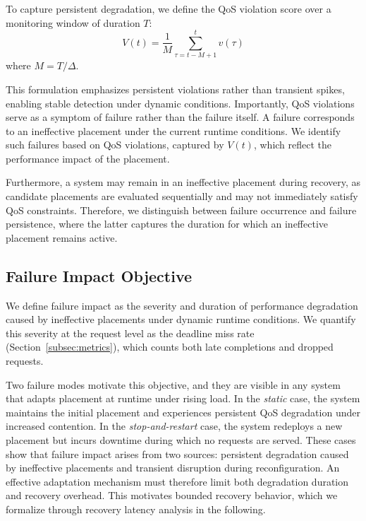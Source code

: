 \documentclass[conference]{IEEEtran}
\begin{document}
To capture persistent degradation, we define the QoS violation score over a monitoring window of duration $T$:
\begin{equation}
V(t) = \frac{1}{M} \sum_{\tau=t-M+1}^{t} v(\tau)
\end{equation}
where $M = T/\Delta$.

This formulation emphasizes persistent violations rather than transient spikes, enabling stable detection under dynamic conditions. 
Importantly, QoS violations serve as a symptom of failure rather than the failure itself. 
A failure corresponds to an ineffective placement under the current runtime conditions.
We identify such failures based on QoS violations, captured by $V(t)$, which reflect the performance impact of the placement.

Furthermore, a system may remain in an ineffective placement during recovery, as candidate placements are evaluated sequentially and may not immediately satisfy QoS constraints. 
Therefore, we distinguish between failure occurrence and failure persistence, where the latter captures the duration for which an ineffective placement remains active.


\subsection{Failure Impact Objective}

We define failure impact as the severity and duration of performance degradation caused by ineffective placements under dynamic runtime conditions. \textcolor{navyblue}{We quantify this severity at the request level as the deadline miss rate (Section~\ref{subsec:metrics}), which counts both late completions and dropped requests.}

\textcolor{navyblue}{Two failure modes motivate this objective, and they are visible in any system that adapts placement at runtime under rising load.}
In the \emph{static} case, the system maintains the initial placement and experiences persistent QoS degradation under increased contention. 
In the \emph{stop-and-restart} case, the system redeploys a new placement but incurs downtime during which no requests are served.
%
These cases show that failure impact arises from two sources: persistent degradation caused by ineffective placements and transient disruption during reconfiguration. 
An effective adaptation mechanism must therefore limit both degradation duration and recovery overhead. 
This motivates bounded recovery behavior, which we formalize through recovery latency analysis in the following.
\end{document}
